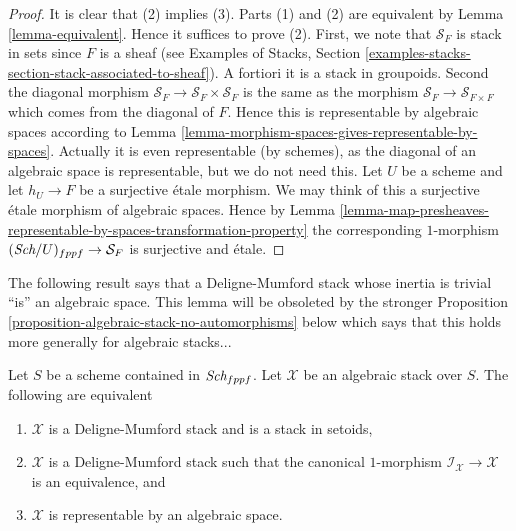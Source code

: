 \begin{proof}
It is clear that (2) implies (3).
Parts (1) and (2) are equivalent by Lemma \ref{lemma-equivalent}.
Hence it suffices to prove (2).
First, we note that $\mathcal{S}_F$ is stack in sets since
$F$ is a sheaf (see
Examples of Stacks,
Section \ref{examples-stacks-section-stack-associated-to-sheaf}).
A fortiori it is a stack in groupoids. Second the diagonal
morphism $\mathcal{S}_F \to \mathcal{S}_F  \times \mathcal{S}_F$
is the same as the morphism $\mathcal{S}_F \to \mathcal{S}_{F \times F}$
which comes from the diagonal of $F$. Hence this is representable
by algebraic spaces according to
Lemma \ref{lemma-morphism-spaces-gives-representable-by-spaces}.
Actually it is even representable (by schemes), as the diagonal of
an algebraic space is representable, but we do not need this.
Let $U$ be a scheme and let $h_U \to F$ be a surjective \'etale morphism.
We may think of this a surjective \'etale morphism of algebraic spaces.
Hence by
Lemma
\ref{lemma-map-presheaves-representable-by-spaces-transformation-property}
the corresponding $1$-morphism $(\textit{Sch}/U)_{fppf} \to \mathcal{S}_F$
is surjective and \'etale.
\end{proof}

\noindent
The following result says that a Deligne-Mumford stack whose inertia
is trivial ``is'' an algebraic space. This lemma will be obsoleted by
the stronger
Proposition \ref{proposition-algebraic-stack-no-automorphisms}
below which says that this holds more generally for algebraic stacks...

\begin{lemma}
\label{lemma-algebraic-stack-no-automorphisms}
Let $S$ be a scheme contained in $\textit{Sch}_{fppf}$.
Let $\mathcal{X}$ be an algebraic stack over $S$.
The following are equivalent
\begin{enumerate}
\item $\mathcal{X}$ is a Deligne-Mumford stack and is a stack in setoids,
\item $\mathcal{X}$ is a Deligne-Mumford stack such that the
canonical $1$-morphism $\mathcal{I}_\mathcal{X} \to \mathcal{X}$
is an equivalence, and
\item $\mathcal{X}$ is representable by an algebraic space.
\end{enumerate}
\end{lemma}

